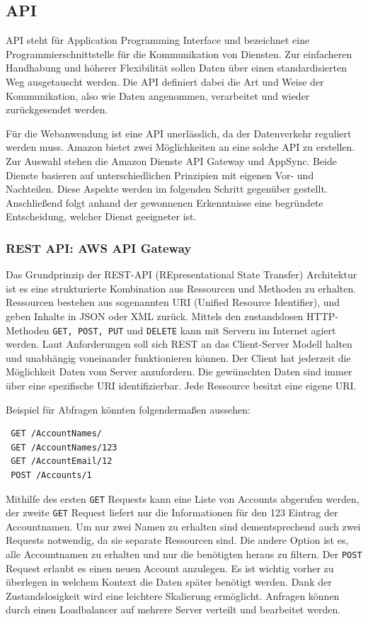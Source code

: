 

\subsection{API}
API steht für Application Programming Interface und bezeichnet eine Programmierschnittstelle für die Kommunikation von Diensten.
Zur einfacheren Handhabung und höherer Flexibilität sollen Daten über einen standardisierten Weg ausgetauscht werden. Die API definiert
dabei die Art und Weise der Kommunikation, also wie Daten angenommen, verarbeitet und wieder zurückgesendet werden.

Für die Webanwendung ist eine API unerlässlich, da der Datenverkehr reguliert werden muss.
Amazon bietet zwei Möglichkeiten an eine solche API zu erstellen.
Zur Auswahl stehen die Amazon Dienste API Gateway und AppSync.
Beide Dienste basieren auf unterschiedlichen Prinzipien mit eigenen Vor- und Nachteilen.
Diese Aspekte werden im folgenden Schritt gegenüber gestellt.
Anschließend folgt anhand der gewonnenen Erkenntnisse eine begründete Entscheidung, welcher Dienst geeigneter ist.


\subsubsection{REST API: AWS API Gateway}
Das Grundprinzip der REST-API (REpresentational State Transfer) Architektur ist es eine strukturierte Kombination aus Ressourcen und Methoden zu erhalten.
Ressourcen bestehen aus sogenannten URI (Unified Resource Identifier), und geben Inhalte in JSON oder XML zurück.
Mittels den zustandslosen HTTP-Methoden \verb+GET, POST, PUT+ und \verb+DELETE+ kann mit Servern im Internet agiert werden.
Laut Anforderungen soll sich REST an das Client-Server Modell halten und unabhängig voneinander funktionieren können.
Der Client hat jederzeit die Möglichkeit Daten vom Server anzufordern.
Die gewünschten Daten sind immer über eine spezifische URI identifizierbar.
Jede Ressource besitzt eine eigene URI.

Beispiel für Abfragen könnten folgendermaßen aussehen:
\begin{verbatim}
 GET /AccountNames/
 GET /AccountNames/123
 GET /AccountEmail/12
 POST /Accounts/1
\end{verbatim}

Mithilfe des ersten \verb+GET+ Requests kann eine Liste von Accounts abgerufen werden, der zweite \verb+GET+ Request liefert nur die Informationen für den 123 Eintrag der Accountnamen.
Um nur zwei Namen zu erhalten sind dementsprechend auch zwei Requests notwendig, da sie separate Ressourcen sind.
Die andere Option ist es, alle Accountnamen zu erhalten und nur die benötigten heraus zu filtern.
Der \verb+POST+ Request erlaubt es einen neuen Account anzulegen.
Es ist wichtig vorher zu überlegen in welchem Kontext die Daten später benötigt werden.
Dank der Zustandslosigkeit wird eine leichtere Skalierung ermöglicht. Anfragen können durch einen Loadbalancer auf mehrere Server verteilt und bearbeitet werden.

